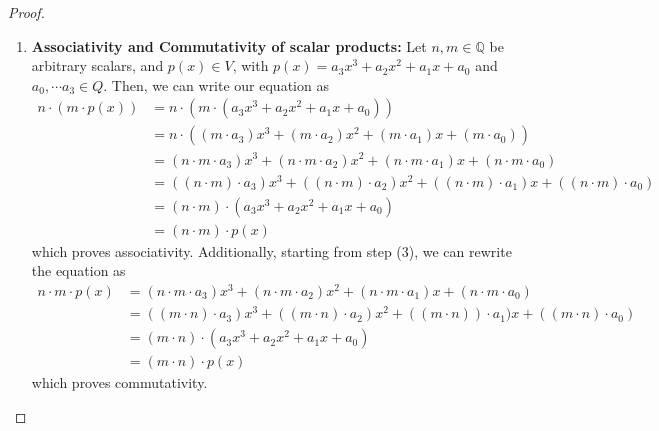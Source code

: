 \documentclass[11pt]{article}
\newcommand{\Q}{\mathbb{Q}}
\begin{document}
\begin{proof}
\begin{enumerate}
\item \textbf{Associativity and Commutativity of scalar products:} Let $n, m \in \Q$ be arbitrary scalars, and $p(x) \in V$, with $p(x)=a_3x^3 + a_2x^2 + a_1x + a_0$ and $a_0, \cdots a_3\in Q$. Then, we can write our equation as
\begin{align}
n \cdot (m \cdot p(x))  &= n \cdot (m \cdot (a_3x^3 + a_2x^2 + a_1x + a_0)) \\
                &= n \cdot ((m \cdot a_3)x^3 + (m \cdot a_2)x^2 + (m \cdot a_1)x + (m \cdot a_0))  \\
                &= (n\cdot m \cdot a_3)x^3 + (n\cdot m \cdot a_2)x^2 + (n\cdot m \cdot a_1)x + (n\cdot m \cdot a_0) \\
                &= ((n\cdot m) \cdot a_3)x^3 + ((n\cdot m) \cdot a_2)x^2 + ((n\cdot m) \cdot a_1)x + ((n\cdot m) \cdot a_0) \\
                &= (n \cdot m) \cdot (a_3x^3 + a_2x^2 + a_1x + a_0)  \\
                &= (n \cdot m) \cdot p(x) 
\end{align}
which proves associativity. Additionally, starting from step (3), we can rewrite the equation as
\begin{align*}
n \cdot m \cdot p(x) &= (n\cdot m \cdot a_3)x^3 + (n\cdot m \cdot a_2)x^2 + (n\cdot m \cdot a_1)x + (n\cdot m \cdot a_0)  \\
&= ((m \cdot n) \cdot a_3)x^3 + ((m\cdot n) \cdot a_2)x^2 + ((m\cdot n)) \cdot a_1)x + ((m\cdot n) \cdot a_0) \\
                &= (m \cdot n) \cdot (a_3x^3 + a_2x^2 + a_1x + a_0)  \\
                &= (m \cdot n) \cdot p(x) 
\end{align*}
which proves commutativity.


\end{enumerate}
\end{proof}
\end{document}

